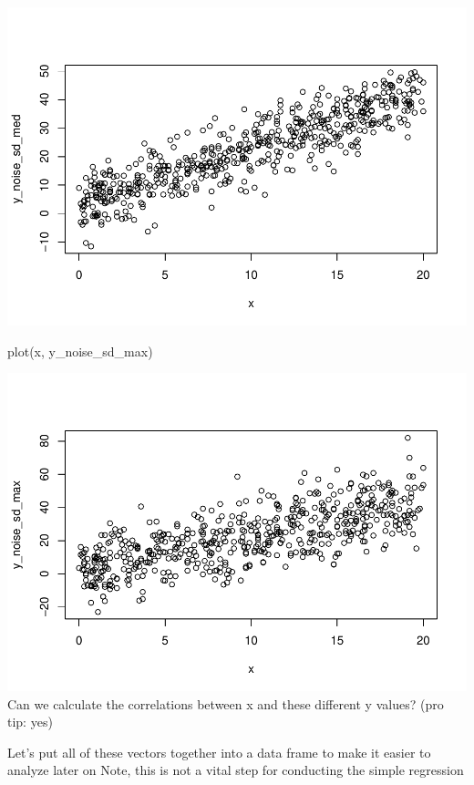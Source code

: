 \documentclass[
]{book}
\newenvironment{Shaded}{\begin{snugshade}}{\end{snugshade}}
\newcommand{\FunctionTok}[1]{\textcolor[rgb]{0.00,0.00,0.00}{#1}}
\newcommand{\NormalTok}[1]{#1}
\begin{document}
\includegraphics{test_course_notes_files/figure-latex/unnamed-chunk-80-3.pdf}

\begin{Shaded}
\begin{Highlighting}[]
\FunctionTok{plot}\NormalTok{(x, y\_noise\_sd\_max)}
\end{Highlighting}
\end{Shaded}

\includegraphics{test_course_notes_files/figure-latex/unnamed-chunk-80-4.pdf}
Can we calculate the correlations between x and these different y values? (pro tip: yes)

Let's put all of these vectors together into a data frame to make it easier to analyze later on
Note, this is not a vital step for conducting the simple regression
\end{document}
